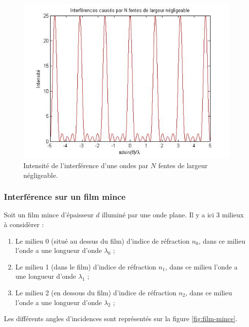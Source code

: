 \begin{figure}[ht]
	\centering
	\includegraphics[scale=0.5]{img/interference.jpg}
	\caption{Intensité de l'interférence d'une ondes par $N$ fentes de largeur négligeable.}
	\label{fig:interference}
\end{figure}

\subsubsection{Interférence sur un film mince}
Soit un film mince d'épaisseur $d$ illuminé par une onde
plane. Il y a ici 3 milieux à considèrer :

\begin{enumerate}
	\item Le milieu 0 (situé au dessus du film) d'indice
	de réfraction $n_0$, dans ce milieu l'onde a une longueur
	d'onde $\lambda_0$ ;
	\item Le milieu 1 (dans le film) d'indice de réfraction
	$n_1$, dans ce milieu l'onde a une longueur d'onde $\lambda_1$ ;
	\item Le milieu 2 (en dessous du film) d'indice de réfraction
	$n_2$, dans ce milieu l'onde a une longueur d'onde $\lambda_2$ ;
\end{enumerate}

Les différents angles d'incidences sont représentés sur la
figure \ref{fig:film-mince}.

